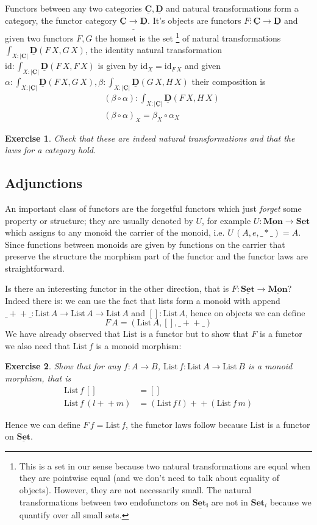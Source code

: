 \documentclass{article}
\newcommand{\Set}{\mathbf{Set}}
\newcommand{\cat}[1]{\underline{\mathbf{#1}}}
\newcommand{\obj}[1]{|#1|}
\newcommand{\homC}[3]{\cat{#1}(#2,#3)}
\newcommand{\id}{\mathrm{id}}
\newcommand{\List}{\mathrm{List}}
\newcommand{\app}{+\!\!+}
\newtheorem{exercise}{Exercise}
\begin{document}
Functors between any two categories $\cat{C},\cat{D}$ and natural transformations form a category, the functor category $\cat{C}\cat{\to}\cat{D}$. It's objects are functors $F : \cat{C} \to \cat{D}$ and given two functors $F,G$ the homset is the set
\footnote{This is a set in our sense because two natural transformations are equal when they are pointwise equal (and we don't need to talk about equality of objects). However, they are not necessarily small. The natural transformations between two endofunctors on $\cat{\Set_i}$ are not in $\Set_i$ because we quantify over all small sets.}
of natural transformations $\int_{X:\obj{\cat{C}}} \homC{D}{F\,X}{G\,X}$, the identity natural transformation $\id : \int_{X:\obj{\cat{C}}}\homC{D}{F\,X}{F\,X}$ is given by $\id_X = \id_{F\,X}$ and given $\alpha : \int_{X:\obj{\cat{C}}} \homC{D}{F\,X}{G\,X}, \beta : \int_{X:\obj{\cat{C}}}\homC{D}{G\,X}{H\,X}$ their composition is 
\begin{align*}
& (\beta \circ \alpha) : \int_{X:\obj{\cat{C}}} \homC{D}{F\,X}{H\,X}\\
& (\beta \circ \alpha)_X = \beta_X \circ \alpha_X
\end{align*}
\begin{exercise}
  Check that these are indeed natural transformations and that the laws for a category hold.
\end{exercise}

\subsection{Adjunctions}
\label{sec:adjunctions}

An important class of functors are the forgetful functors which just \emph{forget} some property or structure; they are usually denoted by $U$, for example $U : \cat{Mon} \to \cat{Set}$ which assigns to any monoid the carrier of the monoid, i.e. $U\,(A,e,\_*\_) = A$. Since functions between monoids are given by functions on the carrier that preserve the structure the morphism part of the functor and the functor laws are straightforward. 

Is there an interesting functor in the other direction, that is $F : \cat{\Set} \to \cat{Mon}$? Indeed there is: we can use the fact that lists form a monoid with append $\_\app\_ : \List\,A \to \List\,A \to \List\,A$ and $[] : \List\,A$, hence on objects we can define
\[ F\,A = (\List\,A, [], \_\app\_) \]
We have already observed that $\List$ is a functor but to show that $F$ is a functor we also need that $\List\,f$ is a monoid morphism:
\begin{exercise}
  Show that for any $f:A \to B$, $\List\,f : \List\,A \to \List\,B$ is a monoid morphism, that is
  \begin{align*}
    \List\,f\,[] & = [] \\
    \List\,f\,(l \app m) & = (\List\,f\,l) \app (\List\,f\,m)
  \end{align*}
\end{exercise}
Hence we can define $F\,f = \List\,f$, the functor laws follow because $\List$ is a functor on $\cat{\Set}$.
\end{document}
